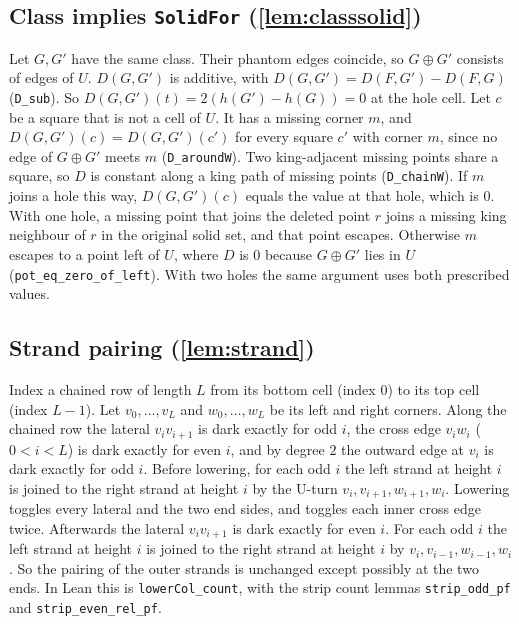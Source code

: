 \documentclass[11pt]{article}
\theoremstyle{plain}
\theoremstyle{definition}
\theoremstyle{remark}
\newcommand{\lean}[1]{\texttt{#1}}
\begin{document}
\subsection{Class implies \lean{SolidFor} (\cref{lem:classsolid})}
\label{app:class}

Let $G,G'$ have the same class.
Their phantom edges coincide, so $G\oplus G'$ consists of edges of $U$.
$D(G,G')$ is additive, with $D(G,G')=D(F,G')-D(F,G)$ (\lean{D\_sub}).
So $D(G,G')(t)=2(h(G')-h(G))=0$ at the hole cell.
Let $c$ be a square that is not a cell of $U$.
It has a missing corner $m$, and $D(G,G')(c)=D(G,G')(c')$ for every square $c'$ with corner $m$, since no
edge of $G\oplus G'$ meets $m$ (\lean{D\_aroundW}).
Two king-adjacent missing points share a square, so $D$ is constant along a king path of missing
points (\lean{D\_chainW}).
If $m$ joins a hole this way, $D(G,G')(c)$ equals the value at that hole, which is $0$.
With one hole, a missing point that joins the deleted point $r$ joins a missing king neighbour of
$r$ in the original solid set, and that point escapes.
Otherwise $m$ escapes to a point left of $U$, where $D$ is $0$ because $G\oplus G'$ lies in $U$
(\lean{pot\_eq\_zero\_of\_left}).
With two holes the same argument uses both prescribed values.

\subsection{Strand pairing (\cref{lem:strand})}
\label{app:strand}

Index a chained row of length $L$ from its bottom cell (index $0$) to its top cell (index $L-1$).
Let $v_0,\dots,v_L$ and $w_0,\dots,w_L$ be its left and right corners.
Along the chained row the lateral $v_iv_{i+1}$ is dark exactly for odd $i$, the cross edge $v_iw_i$
($0<i<L$) is dark exactly for even $i$, and by degree $2$ the outward edge at $v_i$ is dark exactly
for odd $i$.
Before lowering, for each odd $i$ the left strand at height $i$ is joined to the right strand at
height $i$ by the U-turn $v_i,v_{i+1},w_{i+1},w_i$.
Lowering toggles every lateral and the two end sides, and toggles each inner cross edge twice.
Afterwards the lateral $v_iv_{i+1}$ is dark exactly for even $i$.
For each odd $i$ the left strand at height $i$ is joined to the right strand at height $i$ by
$v_i,v_{i-1},w_{i-1},w_i$.
So the pairing of the outer strands is unchanged except possibly at the two ends.
In Lean this is \lean{lowerCol\_count}, with the strip count lemmas \lean{strip\_odd\_pf} and
\lean{strip\_even\_rel\_pf}.
\end{document}
